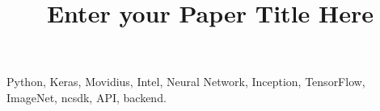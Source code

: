 \documentclass[conference]{IEEEtran}
\begin{document}
	\title{Enter your Paper Title Here}
	\author
	{
	}
	\maketitle
	
	\begin {IEEEkeywords}
		Python, Keras, Movidius, Intel, Neural Network, Inception, TensorFlow, 
		ImageNet, ncsdk, API, backend.
	\end{IEEEkeywords}
	
	
	
	
	
	
	
	
\end{document}
